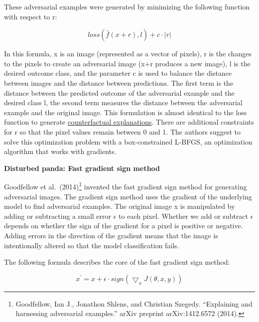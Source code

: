 \documentclass[
  10pt,
]{scrbook}
\begin{document}
These adversarial examples were generated by minimizing the following function with respect to r:

\[loss(\hat{f}(x+r),l)+c\cdot|r|\]

In this formula, x is an image (represented as a vector of pixels), r is the changes to the pixels to create an adversarial image (x+r produces a new image), l is the desired outcome class, and the parameter c is used to balance the distance between images and the distance between predictions.
The first term is the distance between the predicted outcome of the adversarial example and the desired class l, the second term measures the distance between the adversarial example and the original image.
This formulation is almost identical to the loss function to generate \protect\hyperlink{counterfactual}{counterfactual explanations}.
There are additional constraints for r so that the pixel values remain between 0 and 1.
The authors suggest to solve this optimization problem with a box-constrained L-BFGS, an optimization algorithm that works with gradients.

\textbf{Disturbed panda: Fast gradient sign method}

Goodfellow et al.~(2014)\footnote{Goodfellow, Ian J., Jonathon Shlens, and Christian Szegedy. ``Explaining and harnessing adversarial examples.'' arXiv preprint arXiv:1412.6572 (2014).} invented the fast gradient sign method for generating adversarial images.
The gradient sign method uses the gradient of the underlying model to find adversarial examples.
The original image x is manipulated by adding or subtracting a small error \(\epsilon\) to each pixel.
Whether we add or subtract \(\epsilon\) depends on whether the sign of the gradient for a pixel is positive or negative.
Adding errors in the direction of the gradient means that the image is intentionally altered so that the model classification fails.

The following formula describes the core of the fast gradient sign method:

\[x^\prime=x+\epsilon\cdot{}sign(\bigtriangledown_x{}J(\theta,x,y))\]
\end{document}
